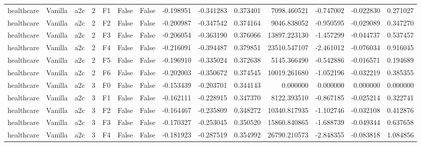 \begin{tabular}{lllrlllrrrrrrr}
healthcare & Vanilla &       a2c &     2 &  F1 &           False &            False & -0.198951 & -0.341283 & 0.373401 &      7098.460521 &          -0.747002 &       -0.022830 &            0.271027 \\
healthcare & Vanilla &       a2c &     2 &  F2 &           False &            False & -0.200987 & -0.347542 & 0.374164 &      9046.838052 &          -0.950595 &       -0.029089 &            0.347270 \\
healthcare & Vanilla &       a2c &     2 &  F3 &           False &            False & -0.206054 & -0.363190 & 0.376066 &     13897.223130 &          -1.457299 &       -0.044737 &            0.537457 \\
healthcare & Vanilla &       a2c &     2 &  F4 &           False &            False & -0.216091 & -0.394487 & 0.379851 &     23510.547107 &          -2.461012 &       -0.076034 &            0.916045 \\
healthcare & Vanilla &       a2c &     2 &  F5 &           False &            False & -0.196910 & -0.335024 & 0.372638 &      5145.366490 &          -0.542886 &       -0.016571 &            0.194689 \\
healthcare & Vanilla &       a2c &     2 &  F6 &           False &            False & -0.202003 & -0.350672 & 0.374545 &     10019.261680 &          -1.052196 &       -0.032219 &            0.385355 \\
healthcare & Vanilla &       a2c &     3 &  F0 &           False &            False & -0.153439 & -0.203701 & 0.344143 &         0.000000 &           0.000000 &        0.000000 &            0.000000 \\
healthcare & Vanilla &       a2c &     3 &  F1 &           False &            False & -0.162111 & -0.228915 & 0.347370 &      8122.393510 &          -0.867185 &       -0.025214 &            0.322741 \\
healthcare & Vanilla &       a2c &     3 &  F2 &           False &            False & -0.164467 & -0.235809 & 0.348272 &     10340.817935 &          -1.102746 &       -0.032108 &            0.412876 \\
healthcare & Vanilla &       a2c &     3 &  F3 &           False &            False & -0.170327 & -0.253045 & 0.350520 &     15860.840865 &          -1.688739 &       -0.049344 &            0.637658 \\
healthcare & Vanilla &       a2c &     3 &  F4 &           False &            False & -0.181923 & -0.287519 & 0.354992 &     26790.210573 &          -2.848355 &       -0.083818 &            1.084856 \\

\end{tabular}
